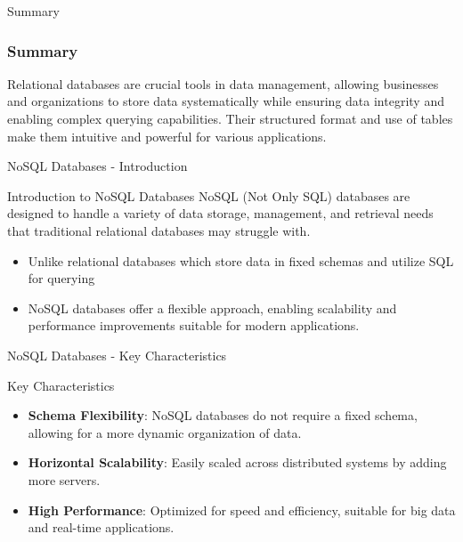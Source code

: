 \documentclass[aspectratio=169]{beamer}
\begin{document}
\begin{frame}[fragile]{Summary}
  \frametitle{Summary}
  Relational databases are crucial tools in data management, allowing businesses and organizations to store data systematically while ensuring data integrity and enabling complex querying capabilities. Their structured format and use of tables make them intuitive and powerful for various applications.
\end{frame}

\begin{frame}[fragile]{NoSQL Databases - Introduction}
    \begin{block}{Introduction to NoSQL Databases}
        NoSQL (Not Only SQL) databases are designed to handle a variety of data storage, management, and retrieval needs that traditional relational databases may struggle with. 
    \end{block}
    \begin{itemize}
        \item Unlike relational databases which store data in fixed schemas and utilize SQL for querying
        \item NoSQL databases offer a flexible approach, enabling scalability and performance improvements suitable for modern applications.
    \end{itemize}
\end{frame}

\begin{frame}[fragile]{NoSQL Databases - Key Characteristics}
    \begin{block}{Key Characteristics}
        \begin{itemize}
            \item \textbf{Schema Flexibility}: NoSQL databases do not require a fixed schema, allowing for a more dynamic organization of data.
            \item \textbf{Horizontal Scalability}: Easily scaled across distributed systems by adding more servers.
            \item \textbf{High Performance}: Optimized for speed and efficiency, suitable for big data and real-time applications.
        \end{itemize}
    \end{block}
\end{frame}
\end{document}
